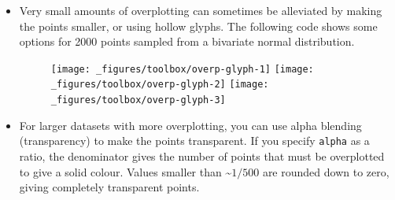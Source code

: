 \begin{itemize}
\item
  Very small amounts of overplotting can sometimes be alleviated by
  making the points smaller, or using hollow glyphs. The following code
  shows some options for 2000 points sampled from a bivariate normal
  distribution. 

\begin{Shaded}
\begin{Highlighting}[]
\StringTok{ }\NormalTok{(} \NormalTok{(}\NormalTok{), } \NormalTok{(}\NormalTok{))}
\StringTok{ }\StringTok{ }\NormalTok{(}\NormalTok{) +}\StringTok{ }\NormalTok{(}\NormalTok{)}
\StringTok{ }\NormalTok{()}
\StringTok{ }\NormalTok{(} \NormalTok{) }
\StringTok{ }\NormalTok{(} \NormalTok{) }
\end{Highlighting}
\end{Shaded}

  \begin{figure}[H]
    \texttt{[image: \_figures/toolbox/overp-glyph-1]}%
    \texttt{[image: \_figures/toolbox/overp-glyph-2]}%
    \texttt{[image: \_figures/toolbox/overp-glyph-3]}
  \end{figure}
\item
  For larger datasets with more overplotting, you can use alpha blending
  (transparency) to make the points transparent. If you specify
  \texttt{alpha} as a ratio, the denominator gives the number of points
  that must be overplotted to give a solid colour. Values smaller than
  \textasciitilde{}\(1/500\) are rounded down to zero, giving completely
  transparent points.  
   

\begin{Shaded}
\begin{Highlighting}[]
\StringTok{ }\NormalTok{(}  \NormalTok{/}\StringTok{ }\NormalTok{)}
\StringTok{ }\NormalTok{(}  \NormalTok{/}\StringTok{ }\NormalTok{)}
\StringTok{ }\NormalTok{(}  \NormalTok{/}\StringTok{ }\NormalTok{)}
\end{Highlighting}
\end{Shaded}


\end{itemize}

